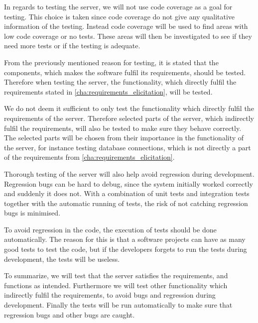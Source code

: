 In regards to testing the server, we will not use code coverage as a goal for testing.
This choice is taken since code coverage do not give any qualitative information of the testing.
Instead code coverage will be used to find areas with low code coverage or no tests.
These areas will then be investigated to see if they need more tests or if the testing is adequate.

From the previously mentioned reason for testing, 
it is stated that the components, which makes the software fulfil its requirements, should be tested.
Therefore when testing the server, the functionality, 
which directly fulfil the requirements stated in \cref{cha:requirements_elicitation}, will be tested.

We do not deem it sufficient to only test the functionality which directly fulfil the requirements of the server.
Therefore selected parts of the server, which indirectly fulfil the requirements, 
will also be tested to make sure they behave correctly.
The selected parts will be chosen from their importance in the functionality of the server,
for instance testing database connections, 
which is not directly a part of the requirements from \cref{cha:requirements_elicitation}.


Thorough testing of the server will also help avoid regression during development.
Regression bugs can be hard to debug, since the system initially worked correctly and suddenly it does not.
With a combination of unit tests and integration tests together with the automatic running of tests,
the risk of not catching regression bugs is minimised\cite{regression}.

To avoid regression in the code, the execution of tests should be done automatically.
The reason for this is that a software projects can have as many good tests to test the code,
but if the developers forgets to run the tests during development,
the tests will be useless.

\bigskip
To summarize, we will test that the server satisfies the requirements,
and functions as intended. 
Furthermore we will test other functionality which indirectly fulfil the requirements,
to avoid bugs and regression during development.
Finally the tests will be run automatically to make sure that regression bugs and other bugs are caught.


